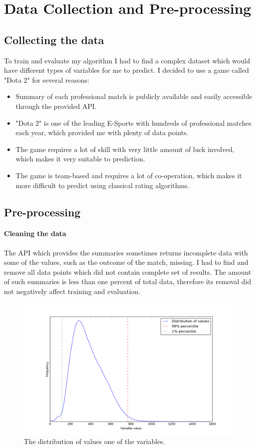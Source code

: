 \documentclass[12pt,a4paper]{book}
\begin{document}
\section{Data Collection and Pre-processing}
\subsection{Collecting the data}
To train and evaluate my algorithm I had to find a complex dataset which would have different types of variables for me to predict.
I decided to use a game called "Dota 2" for several reasons:
\begin{itemize}
\item Summary of each professional match is publicly available and easily accessible through the provided API.
\item "Dota 2" is one of the leading E-Sports with hundreds of professional matches each year, which provided me with plenty of data points.
\item The game requires a lot of skill with very little amount of luck involved, which makes it very suitable to prediction.
\item The game is team-based and requires a lot of co-operation, which makes it more difficult to predict using classical rating algorithms.
\end{itemize}
\begin{figure}

\end{figure}
\subsection{Pre-processing}
\paragraph{Cleaning the data}
The API which provides the summaries sometimes returns incomplete data with some of the values, such as the outcome of the match, missing.
I had to find and remove all data points which did not contain complete set of results.
The amount of such summaries is less than one percent of total data, therefore its removal did not negatively affect training and evaluation.
\begin{figure}[ht]
\centering
\includegraphics[scale=0.5]{outliers}
\caption{The distribution of values one of the variables.}
\label{fig:outliers}
\end{figure}
\end{document}
